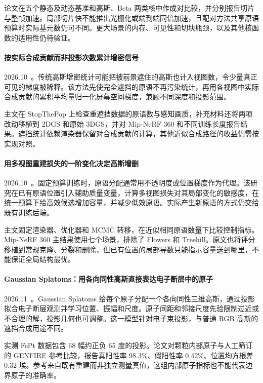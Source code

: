 论文在五个静态及动态基准和高斯、Beta 两类核中作成对比较，并分别报告切片与整帧加速。局部切片快不能推出光栅化或端到端同倍加速，且配对方法共享原语预算时实际基元数仍可不同。更大场景的内存、可见性和切块瓶颈，以及其他核函数的适用性仍待验证。

\paragraph{按实际合成贡献而非投影次数累计增密信号}
2026.10~\cite{2610_27108}。传统高斯增密统计可能把被前景遮住的高斯也计入视图数，令少量真正可见的梯度被稀释。该方法先使完全遮挡的原语不再污染统计，再用各视图中实际合成贡献的累积平均量归一化屏幕空间梯度，兼顾不同深度和投影范围。

主文在 StopThePop 上检查重遮挡数据的原语数与感知画质，补充材料还将两项改动移植到 2DGS 和原始 3DGS，并对 Mip-NeRF 360 和不同训练长度报告结果。遮挡统计依赖渲染器保留对合成贡献的计算，其他近似合成路径的收益仍需按实现对照。

\paragraph{用多视图重建损失的一阶变化决定高斯增删}
2026.10~\cite{2610_34344}。固定预算训练时，原语分配通常用不透明度或位置梯度作为代理。该研究在已有原语位置引入辅助质量变量，计算多视图损失对其局部变化的敏感度，在统一预算下给高效候选增加容量，并减少低效原语。实际产生新原语的方式仍交给既有训练后端。

主文固定渲染器、优化器和 MCMC 转移，在近似相同原语数量下比较控制指标。Mip-NeRF 360 主结果使用七个场景，排除了 Flowers 和 Treehill。原文也将评分移植到常规克隆、分裂和删除，但已有位置的局部导数只能指示容量送到哪里，不能保证全局结构最优。

\paragraph{Gaussian Splatoms：用各向同性高斯直接表达电子断层中的原子}
2026.11~\cite{2611_23444}。Gaussian Splatoms 给每个原子分配一个各向同性三维高斯，通过投影拟合电子断层观测并学习位置、振幅和尺度。原子间距和邻接尺度先验限制过近或不合理的解，投影几何也可调整。这一模型针对电子束投影，与普通 RGB 高斯的遮挡合成用途不同。

实测 FePt 数据包含 68 幅约正负 65 度的投影。论文对颗粒内部原子与人工筛订的 GENFIRE 参考比较，报告真阳性率 98.3\%、假阳性率 0.42\%、位置均方根差 0.32 埃。参考来自既有重建而非独立测量真值，这组内部原子指标也不能代表边界原子的准确率。
